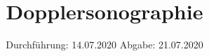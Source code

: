 

\subject{Versuch Nr. 903}
\title{Dopplersonographie}
\date{%
  Durchführung: 14.07.2020
  \hspace{3em}
  Abgabe: 21.07.2020
}


\setlength{\parindent}{0pt} %

\maketitle
\thispagestyle{empty}
\tableofcontents
\newpage








\printbibliography{}


